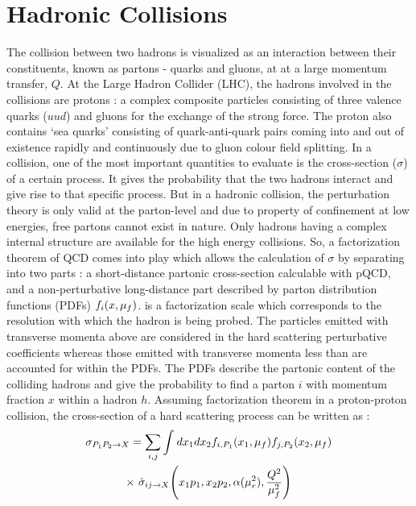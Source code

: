 \section{Hadronic Collisions}

The collision between two hadrons is visualized as an interaction between their constituents, known as partons - quarks and gluons, at at a large momentum transfer, $Q$. At the Large Hadron Collider (LHC), the hadrons involved in the collisions are protons : a complex composite particles consisting of three valence quarks ($uud$) and gluons for the exchange of the strong force. The proton also contains `sea quarks' consisting of quark-anti-quark pairs coming into and out of existence rapidly and continuously due to gluon colour field splitting. In a collision, one of the most important quantities to evaluate is the cross-section ($\sigma$) of a certain process. It gives the probability that the two hadrons interact and give rise to that specific process. But in a hadronic collision, the perturbation theory is only valid at the parton-level and due to property of confinement at low energies, free partons cannot exist in nature. Only hadrons having a complex internal structure are available for the high energy collisions. So, a factorization theorem of QCD \cite{Collins:1989gx} comes into play which allows the calculation of $\sigma$ by separating into two parts : a short-distance partonic cross-section calculable with pQCD, and a non-perturbative long-distance part described by parton distribution functions (PDFs) $f_i(x,\mu_f)$. \muf is a factorization scale which corresponds to the resolution with which the hadron is being probed. The particles emitted with transverse momenta above \muf are considered in the hard scattering perturbative coefficients whereas those emitted with transverse momenta less than \muf are accounted for within the PDFs. The PDFs describe the partonic content of the colliding hadrons and give the probability to find a parton $i$ with momentum fraction $x$ within a hadron $h$. Assuming factorization theorem in a proton-proton collision, the cross-section of a hard scattering process can be written as :
\begin{equation}
\begin{gathered}
\sigma_{P_1P_2 \rightarrow X} = \sum\limits_{i,j}^{}\int_{}^{} dx_1dx_2f_{i,P_1}(x_1,\muf)f_{j,P_2}(x_2,\muf)\\\times~\hat\sigma_{ij\rightarrow X} \Bigg(x_1p_1,x_2p_2,\alpha(\mur^2),\frac{Q^2}{\muf^2}\Bigg)
\end{gathered}
\end{equation}

